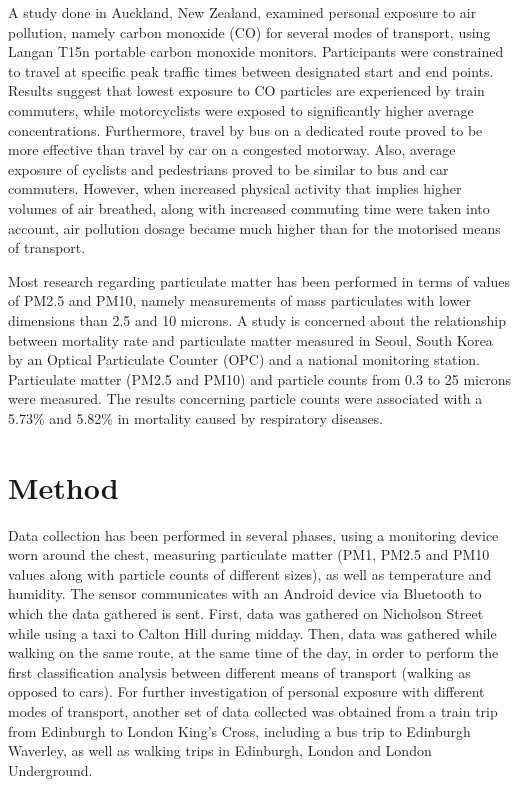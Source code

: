 \documentclass[bsc,frontabs,twoside,singlespacing,parskip,deptreport]{infthesis}     %
\begin{document}
A study \cite{Dirks2012} done in Auckland, New Zealand, examined personal exposure to air pollution, namely carbon monoxide (CO) for several modes of transport, using Langan T15n \cite{Langan} portable carbon monoxide monitors. Participants were constrained to travel at specific peak traffic times between designated start and end points. Results suggest that lowest exposure to CO particles are experienced by train commuters, while motorcyclists were exposed to significantly higher average concentrations. Furthermore, travel by bus on a dedicated route proved to be more effective than travel by car on a congested motorway. Also, average exposure of cyclists and pedestrians proved to be similar to bus and car commuters. However, when increased physical activity that implies higher volumes of air breathed, along with increased commuting time were taken into account, air pollution dosage became much higher than for the motorised means of transport.

Most research regarding particulate matter has been performed in terms of values of PM2.5 and PM10, namely measurements of mass particulates with lower dimensions than 2.5 and 10 microns. A study \cite{Cho2008} is concerned about the relationship between mortality rate and particulate matter measured in Seoul, South Korea by an Optical Particulate Counter (OPC) and a national monitoring station. Particulate matter (PM2.5 and PM10) and particle counts from 0.3 to 25 microns were measured. The results concerning particle counts were associated with a 5.73\% and 5.82\% in mortality caused by respiratory diseases.

\section{Method}

Data collection has been performed in several phases, using a monitoring device worn around the chest, measuring particulate matter (PM1, PM2.5 and PM10 values along with particle counts of different sizes), as well as temperature and humidity. The sensor communicates with an Android device via Bluetooth to which the data gathered is sent. First, data was gathered on Nicholson Street while using a taxi to Calton Hill during midday. Then, data was gathered while walking on the same route, at the same time of the day, in order to perform the first classification analysis between different means of transport (walking as opposed to cars). For further investigation of personal exposure with different modes of transport, another set of data collected was obtained from a train trip from Edinburgh to London King's Cross, including a bus trip to Edinburgh Waverley, as well as walking trips in Edinburgh, London and London Underground.
\end{document}
